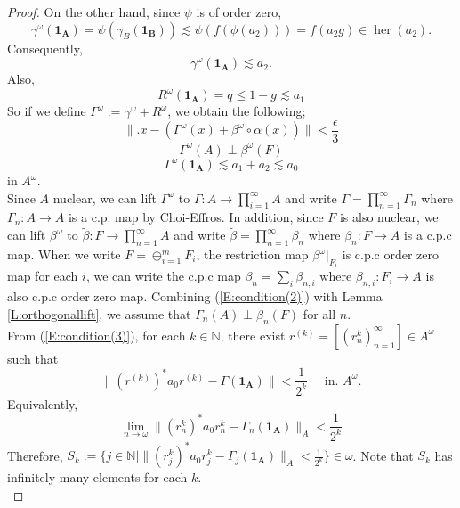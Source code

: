 \documentclass[12pt]{amsart}
\theoremstyle{plain}
\theoremstyle{definition}
\def\her{\operatorname{her}}
\numberwithin{equation}{section}
\begin{document}
\begin{proof}
On the other hand,  since $\psi$ is of order zero, 
\[
\gamma^{\omega}(\mathbf{1_A})=\psi(\gamma_B(\mathbf{1_B})) \lesssim \psi(f(\phi(a_2))) = f(a_2 g) \in \her(a_2). 
\]
Consequently, 
\begin{equation}\label{E:Cuntz1}
\gamma^{\omega}(\mathbf{1_A}) \lesssim a_2.
\end{equation}
Also, 
\begin{equation}\label{E:Cuntz2}
R^{\omega}(\mathbf{1_A})=q \le1-g \lesssim a_1
\end{equation}
So if we define $\Gamma^{\omega}:= \gamma^{\omega}+ R^{\omega}$, we obtain the following; 
\begin{equation}\label{E:condition(1)}
\|.x -(\Gamma^{\omega}(x)+ \beta^{\omega} \circ \alpha(x))  \| < \frac{\epsilon}{3}
\end{equation} 
\begin{equation}\label{E:condition(2)}
\Gamma^{\omega}(A) \perp \beta^{\omega}(F)
\end{equation}
\begin{equation}\label{E:condition(3)}
\Gamma^{\omega}(\mathbf{1_A}) \lesssim a_1 +a_2 \lesssim a_0  
\end{equation}
in $A^{\omega}$.\\  
Since $A$ nuclear, we can lift $\Gamma^{\omega}$ to $\Gamma: A \to \prod_{i=1}^{\infty} A$ and write $\Gamma= \prod_{n=1}^{\infty} \Gamma_n $ where $\Gamma_n: A \to A$ is a c.p. map by Choi-Effros. In addition, since $F$ is also nuclear, we can lift $\beta^{\omega}$ to $\widetilde{\beta}: F \to \prod_{n=1}^{\infty} A$ and write $\widetilde{\beta}=\prod_{n=1}^{\infty} \beta_n$ where $\beta_n: F \to A$ is a c.p.c map.    When we write $F=\oplus_{i=1}^m F_i $, the restriction map $\beta^{\omega}|_{F_i}$ is c.p.c order zero map for each $i$, we can write the c.p.c map $\beta_n=\sum_i \beta_{n, i}$ where $\beta_{n, i}: F_i \to A$ is also c.p.c order zero map. Combining (\ref{E:condition(2)}) with  Lemma \ref{L:orthogonallift}, we assume that $\Gamma_n(A) \perp \beta_n(F)$ for all $n$.\\  
\noindent
 From (\ref{E:condition(3)}), for each $k \in \mathbb{N}$, there exist $r^{(k)}=[(r^k_n)_{n=1}^{\infty}] \in A^{\omega}$ such that 
 \[  \| (r^{(k)})^* a_0 r^{(k)} - \Gamma(\mathbf{1_A}) \|  < \frac{1}{2^k} \quad \text{ in. $A^{\omega}$}. \] 
 Equivalently, 
 \[ \lim_{n \to \omega} \| (r^k_n)^* a_0 r^k_n - \Gamma_n (\mathbf{1_A}) \|_A < \frac{1}{2^k} \] 
 Therefore, $S_k:= \{j \in \mathbb{N}\mid \| (r^k_j)^* a_0  r^k_j - \Gamma_j (\mathbf{1_A})\|_A < \frac{1}{2^k}  \} \in \omega$. Note that $S_k$ has infinitely many elements for each $k$. \\

\end{proof}
\end{document}
